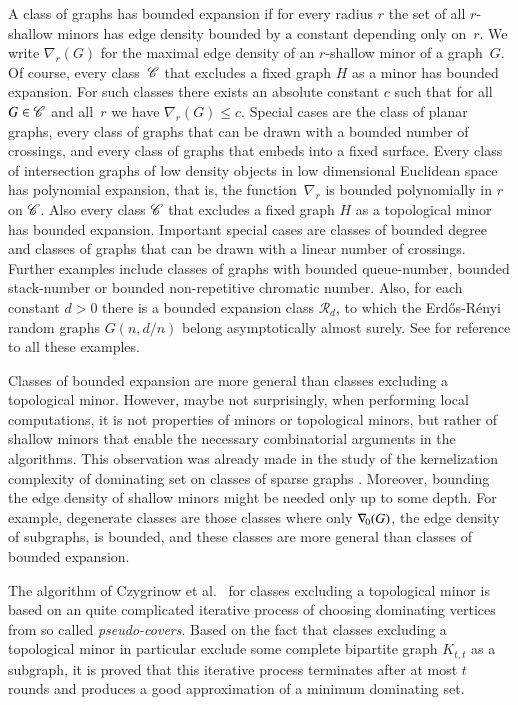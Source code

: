\medskip
A class of graphs has
bounded expansion if for every radius $r$ the set of all \mbox{$r$-shallow}
minors has edge density bounded by a constant depending only on~$r$.
We write $\nabla_r(G)$ for the maximal edge density of an
$r$-shallow minor of a graph~$G$.
Of course, every class~$\mathscr{C}$ that excludes a fixed graph $H$ as
a minor has bounded expansion. For such classes there exists an
absolute constant
$c$ such that for all $G\in\mathscr{C}$ and all~$r$
we have $\nabla_r(G)\leq c$.
Special cases are the class of
planar graphs, every class of graphs that can be drawn
with a bounded number of crossings, and every class of graphs
that embeds into a fixed surface.
Every class of intersection graphs of low density objects in low
dimensional Euclidean space has polynomial expansion, that is, the function~$\nabla_r$ is bounded polynomially in $r$ on $\mathscr{C}$. Also
every class $\mathscr{C}$ that excludes a fixed graph $H$ as
a topological minor has bounded expansion.
Important special cases are classes of
bounded degree and classes of graphs that can be drawn
with a linear number of crossings.
Further examples include
classes of graphs with bounded queue-number, bounded stack-number or bounded
non-repetitive chromatic number. Also, for each constant $d>0$ there is a bounded expansion class $\mathscr R_d$, to which  the Erd\H os-R\'enyi random graphs $G(n,d/n)$ belong
asymptotically almost surely.
See \cite{har2017approximation,nevsetvril2012characterisations} for reference
to  all these examples.

Classes of bounded expansion are more general than
classes excluding a topological minor. However, maybe
not surprisingly, when performing local
computations, it is not properties of minors or topological minors, but
rather of shallow minors that enable the necessary combinatorial arguments
in the algorithms. This observation was already made in the study of the kernelization complexity of dominating set on classes of sparse graphs \cite{DrangeDFKLPPRVS16,eiben2019lossy,EickmeyerGKKPRS17,FabianskiPST19,kreutzer2018polynomial}.
Moreover, bounding the edge density of shallow minors might be needed only up to some depth.
For example, degenerate classes
are those classes where only $\nabla_{\hspace{-1pt}0}(G)$, the edge
density of subgraphs, is bounded, and
these classes are  more general than classes of bounded
expansion.

The algorithm of Czygrinow et al.~\cite{czygrinow2018distributed} for
classes excluding a topological minor is
based on an quite complicated iterative process of choosing dominating
vertices from so called
\emph{pseudo-covers}. Based on the fact that classes excluding a topological minor in particular exclude some complete bipartite graph
$K_{t,t}$ as a subgraph, it is proved that this iterative process terminates
after at most $t$ rounds and
produces a good approximation of a minimum dominating set.

